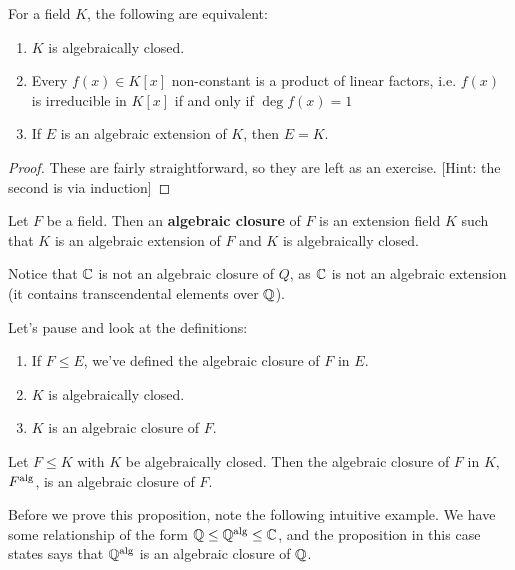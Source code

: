 \documentclass{../mathnotes}
\begin{document}
\begin{thm}
    For a field $K$, the following are equivalent:
    \begin{enumerate}
        \item $K$ is algebraically closed.
        \item Every $f(x)\in K[x]$ non-constant is a product of linear factors, i.e. $f(x)$ is irreducible in $K[x]$ if and only if
            $\deg f(x)=1$
        \item If $E$ is an algebraic extension of $K$, then $E=K$.
    \end{enumerate}
\end{thm}
\begin{proof}
    These are fairly straightforward, so they are left as an exercise. [Hint: the second is via induction]
\end{proof}

\begin{defn}
    Let $F$ be a field. Then an \textbf{algebraic closure} of $F$ is an extension field $K$ such that $K$ is an algebraic extension
    of $F$ and $K$ is algebraically closed.
\end{defn}
\begin{rem}
    Notice that $\mathbb{C}$ is not an algebraic closure of $Q$, as $\mathbb{C}$ is not an algebraic extension (it contains transcendental elements over $\mathbb{Q}$).
\end{rem}

Let's pause and look at the definitions:
\begin{enumerate}
    \item If $F\leq E$, we've defined the algebraic closure of $F$ in $E$.
    \item $K$ is algebraically closed.
    \item $K$ is an algebraic closure of $F$.
\end{enumerate}

\begin{thm}
    Let $F\leq K$ with $K$ be algebraically closed. Then the algebraic closure of $F$ in $K$, $F^{\rm alg}$, is an algebraic closure of $F$.
\end{thm}

\begin{exmp}
    Before we prove this proposition, note the following intuitive example.
    We have some relationship of the form $\mathbb{Q}\leq \mathbb{Q}^{\rm alg}\leq \mathbb{C}$, and the proposition in this case states says that
    $\mathbb{Q}^{\rm alg}$ is an algebraic closure of $\mathbb{Q}$.
\end{exmp}
\end{document}
